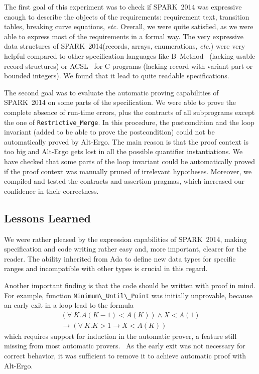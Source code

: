 \documentclass[10pt,a4paper,twocolumn]{article}
\newcommand{\newspark}{SPARK~2014\xspace}
\newcommand{\altergo}{Alt-Ergo\xspace}
\newcommand{\etc}{\textit{etc.}\xspace}
\newcommand{\SPARK}[1]{\lstinline[language=Ada,basicstyle={\footnotesize
      \sffamily},framesep=0pt]$#1$}
\begin{document}
The first goal of this experiment was to check if \newspark was
expressive enough to describe the objects of the requirements:
requirement text, transition tables, breaking curve equations, \etc
Overall, we were quite satisfied, as we were able to express most of
the requirements in a formal way. The very expressive data structures
of \newspark (records, arrays, enumerations, \etc) were very helpful
compared to other specification languages like B~Method~\cite{b-book}
(lacking usable record structures) or ACSL~\cite{acsl} for C programs
(lacking record with variant part or bounded integers).
We found that it lead to quite readable specifications.

The second goal was to evaluate the automatic proving capabilities of \newspark
on some parts of the specification. We were able to prove the complete absence
of run-time errors, plus the contracts of all subprograms except the one of
\SPARK{Restrictive_Merge}. In this procedure, the postcondition and the loop
invariant (added to be able to prove the postcondition) could not be
automatically proved by \altergo. The main reason is that the proof context is
too big and \altergo gets lost in all the possible quantifier
instantiations. We have checked that some parts of the loop invariant could be
automatically proved if the proof context was manually pruned of irrelevant
hypotheses. Moreover, we compiled and tested the contracts and assertion
pragmas, which increased our confidence in their correctness.

\subsection{Lessons Learned}

We were rather pleased by the expression capabilities of \newspark, making
specification and code writing rather easy and, more important, clearer for the
reader. The ability inherited from Ada to define new data types for specific
ranges and incompatible with other types is crucial in this regard.

Another important finding is that the code should be written with proof in
mind. For example, function \SPARK{Minimum\_Until\_Point} was initially
unprovable, because an early exit in a loop lead to the formula
\begin{multline*}
(\forall~K. A(K-1)<A(K)) \wedge X<A(1) \\
\rightarrow (\forall~K. K>1 \rightarrow X<A(K))
\end{multline*}
which requires support for induction in the automatic prover, a feature still
missing from most automatic provers.~\cite{leino:2012:vmcai} As the early exit
was not necessary for correct behavior, it was sufficient to remove it to
achieve automatic proof with \altergo.
\end{document}
